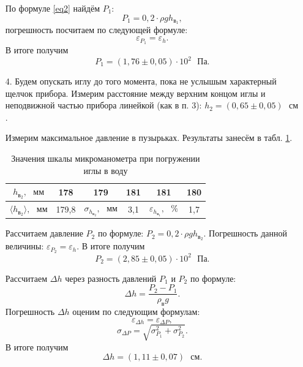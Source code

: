 \documentclass[a4paper, 12pt]{article}
\begin{document}
\begin{enumerate}
        По формуле \eqref{eq2} найдём $P_1$:
        \begin{equation}
            P_1 = 0,2 \cdot \rho g h_{в_1},
        \end{equation}
        погрешность посчитаем по следующей формуле:
        \begin{equation}
            \varepsilon_{P_1} = \varepsilon_h.
        \end{equation}
        В итоге получим
        \begin{equation}
            P_1 = (1,76 \pm 0,05) \cdot 10^2 \text{ } Па.
        \end{equation}
        
        \item[4.] Будем опускать иглу до того момента, пока не услышым характерный щелчок прибора. Измерим расстояние между верхним концом иглы и неподвижной частью прибора линейкой (как в п. 3): $h_2 = (0,65 \pm 0,05) \text{ } см$.
        
        Измерим максимальное давление в пузырьках. Результаты занесём в табл. \ref{table3}.
        
        \begin{table}[ht]
            \centering
            \begin{tabular}{|c|c|c|c|c|c|}
                \hline
                $h_{в_{2}}, \text{ } мм$ & 178 & 179 & 181 & 181 & 180 \\
                \hline
                $\langle h_{в_2} \rangle, \text{ } мм$ & 179,8 & $\sigma_{h_{в_2}}, \text{ } мм$ & 3,1 & $\varepsilon_{h_{в_1}}, \text{ } \%$ & 1,7 \\
                \hline
            \end{tabular}
            \caption{Значения шкалы микроманометра при погружении иглы в воду}
            \label{table3}
        \end{table}
        
        Рассчитаем давление $P_2$ по формуле: $P_2 = 0,2 \cdot \rho g h_{в_2}$. Погрешность данной величины: $\varepsilon_{P_2} = \varepsilon_h$. В итоге получим
        \begin{equation}
            P_2 = (2,85 \pm 0,05) \cdot 10^2 \text{ } Па.
        \end{equation}
        
        Рассчитаем $\Delta h$ через разность давлений $P_1$ и $P_2$ по формуле:
        \begin{equation}
            \Delta h = \frac{P_2 - P_1}{\rho_в g}.
        \end{equation}
        Погрешность $\Delta h$ оценим по следующим формулам:
        \begin{equation}
            \varepsilon_{\Delta h} = \varepsilon_{\Delta P},
        \end{equation}
        \begin{equation}
            \sigma_{\Delta P} = \sqrt{\sigma_{P_1}^2 + \sigma_{P_2}^2}.
        \end{equation}
        В итоге получим
        \begin{equation}
            \Delta h = (1,11 \pm 0,07) \text{ } см.
        \end{equation}
        

\end{enumerate}
\end{document}

